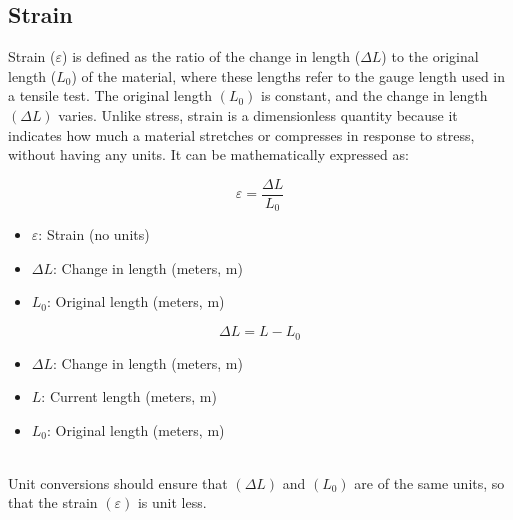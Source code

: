 \documentclass{article}
\begin{document}
        \subsection{Strain}
        Strain ($\varepsilon$) is defined as the ratio of the change in length ($\Delta L$) to the original length ($L_0$) of the material, where these lengths refer to the gauge length used in a tensile test. The original length \((L_0)\) is constant, and the change in length \((\Delta L)\) varies\footnotemark. Unlike stress, strain is a dimensionless quantity because it indicates how much a material stretches or compresses in response to stress, without having any units. It can be mathematically expressed as:\\[8pt]
        
        \begin{minipage}{0.48\textwidth}
            \begin{equation}
                \varepsilon = \frac{\Delta L}{L_0}
                \label{eq:strain}
            \end{equation}
            \begin{itemize}[left=0pt,itemsep=-1mm]
                \item \( \varepsilon \): Strain (no units)
                \item \( \Delta L \): Change in length (meters, \(\text{m}\))
                \item \( L_0 \): Original length (meters, \(\text{m}\))    
            \end{itemize}
        \end{minipage}\hfill
        \begin{minipage}{0.48\textwidth}
            \begin{equation}
                \Delta L =  L - L_0
                \label{eq:deltaL}
            \end{equation}
            \begin{itemize}[left=0pt,itemsep=-1mm]
                \item \( \Delta L \): Change in length (meters, \(\text{m}\))
                \item \( L \): Current length (meters, \(\text{m}\))
                \item \( L_0 \): Original length (meters, \(\text{m}\))
            \end{itemize}
        \end{minipage}\\[8pt]
        Unit conversions should ensure that $(\Delta L)$ and $(L_0)$ are of the same units, so that the strain $(\varepsilon)$ is unit less.\\[8pt]
\end{document}
